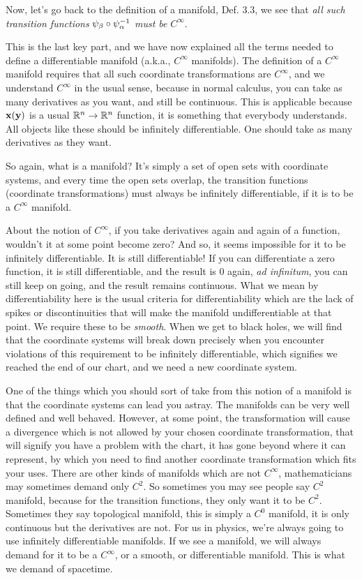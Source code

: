 		Now, let's go back to the definition of a manifold, Def. 3.3, we see that \textit{all such transition functions} $\psi_\beta\circ\psi_\alpha^{-1}$ \textit{must be }$C^\infty$.

		This is the last key part, and we have now explained all the terms needed to define a differentiable manifold (a.k.a., $C^\infty$ manifolds). The definition of a $C^\infty$ manifold
		requires that all such coordinate transformations are $C^\infty$, and we understand $C^\infty$ in the usual sense, because in normal calculus, you can take as many 
		derivatives as you want, and still be continuous. This is applicable because $\vb{x}(\vb y)$ is a usual $\mathbb{R}^n\to \mathbb{R}^n$ function, it is something that everybody understands.
		All objects like these should be infinitely differentiable. One should take as many derivatives as they want.

		So again, what is a manifold? It's simply a set of open sets with coordinate systems, and every time the open sets overlap, the transition functions (coordinate transformations) must
		always be infinitely differentiable, if it is to be a $C^\infty$ manifold.
		\begin{question}{About the notion of $C^\infty$, if you take derivatives again and again of a function, wouldn't it at some point become zero? And so, it seems impossible for it to be infinitely differentiable.}
			It is still differentiable! If you can differentiate a zero function, it is still differentiable, and the result is 0 again, \textit{ad infinitum}, you can still keep on going, and the result remains continuous. 
			What we mean by differentiability here is the usual criteria for differentiability which are the lack of spikes or discontinuities that will make the manifold undifferentiable at that point. We require these to be \textit{smooth}.
			When we get to black holes, we will find that the coordinate systems will break down precisely when you encounter violations of this requirement to be infinitely differentiable,
			which signifies we reached the end of our chart, and we need a new coordinate system. 
		\end{question}	
		One of the things which you should sort of take from this notion of a manifold is that the coordinate 
		systems can lead you astray. The manifolds can be very well defined and well behaved. However, at some point, the transformation will cause a divergence which is not allowed by your
		chosen coordinate transformation, that will signify you have a problem with the chart, it has gone beyond where it can represent, by which you need to find another coordinate transformation which fits your uses.
		There are other kinds of manifolds which are not $C^\infty$, mathematicians may sometimes demand only $C^2$. So sometimes you may 
		see people say $C^2$ manifold, because for the transition functions, they only want it to be 
		$C^2$. Sometimes they say topological manifold, this is simply a $C^0$ manifold, it is only continuous but the derivatives are not. 
		For us in physics, we're always going to use infinitely differentiable manifolds. If we see a manifold, we will always demand for it to be a $C^\infty$, or a smooth, or differentiable manifold.
		This is what we demand of spacetime.


